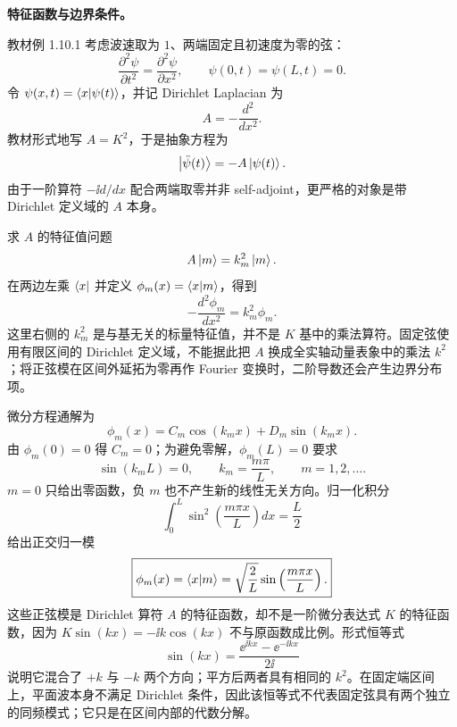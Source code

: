 \begin{checkedsolution}
\textbf{特征函数与边界条件。}

教材例 1.10.1 考虑波速取为 $1$、两端固定且初速度为零的弦：
\begin{equation}
  \frac{\partial^2\psi}{\partial t^2}
  =\frac{\partial^2\psi}{\partial x^2},
  \qquad
  \psi(0,t)=\psi(L,t)=0.
  \label{eq:QM-C01-S10-wave-equation}
\end{equation}
令 $\psi(x,t)=\left\langle x \middle| \psi(t) \right\rangle$，并记 Dirichlet Laplacian 为
\[
  A=-\frac{d^2}{dx^2}.
\]
教材形式地写 $A=K^2$，于是抽象方程为
\begin{equation}
  \left|\ddot\psi(t)\right\rangle=-A\left|\psi(t)\right\rangle.
  \label{eq:QM-C01-S10-abstract-wave-equation}
\end{equation}
由于一阶算符 $-\ii d/dx$ 配合两端取零并非 self-adjoint，更严格的对象是带 Dirichlet 定义域的 $A$ 本身。

求 $A$ 的特征值问题
\begin{equation}
  A\left|m\right\rangle=k_m^2\left|m\right\rangle.
  \label{eq:QM-C01-S10-string-abstract-eigenproblem}
\end{equation}
在两边左乘 $\left\langle x\right|$ 并定义 $\phi_m(x)=\left\langle x \middle| m \right\rangle$，得到
\begin{equation}
  -\frac{d^2\phi_m}{dx^2}=k_m^2\phi_m.
  \label{eq:QM-C01-S10-string-x-eigenproblem}
\end{equation}
这里右侧的 $k_m^2$ 是与基无关的标量特征值，并不是 $K$ 基中的乘法算符。固定弦使用有限区间的 Dirichlet 定义域，不能据此把 $A$ 换成全实轴动量表象中的乘法 $k^2$；将正弦模在区间外延拓为零再作 Fourier 变换时，二阶导数还会产生边界分布项。

微分方程通解为
\[
  \phi_m(x)=C_m\cos(k_mx)+D_m\sin(k_mx).
\]
由 $\phi_m(0)=0$ 得 $C_m=0$；为避免零解，$\phi_m(L)=0$ 要求
\begin{equation}
  \sin(k_mL)=0,
  \qquad
  k_m=\frac{m\pi}{L},
  \qquad m=1,2,\ldots.
  \label{eq:QM-C01-S10-string-wavenumbers}
\end{equation}
$m=0$ 只给出零函数，负 $m$ 也不产生新的线性无关方向。归一化积分
\[
  \int_0^L\sin^2\left(\frac{m\pi x}{L}\right)dx=\frac L2
\]
给出正交归一模
\begin{equation}
  \boxed{
  \phi_m(x)=\left\langle x \middle| m \right\rangle
  =\sqrt{\frac2L}\sin\left(\frac{m\pi x}{L}\right).}
  \label{eq:QM-C01-S10-string-normal-modes}
\end{equation}
这些正弦模是 Dirichlet 算符 $A$ 的特征函数，却不是一阶微分表达式 $K$ 的特征函数，因为 $K\sin(kx)=-\ii k\cos(kx)$ 不与原函数成比例。形式恒等式
\[
  \sin(kx)=\frac{\ee^{\ii kx}-\ee^{-\ii kx}}{2\ii}
\]
说明它混合了 $+k$ 与 $-k$ 两个方向；平方后两者具有相同的 $k^2$。在固定端区间上，平面波本身不满足 Dirichlet 条件，因此该恒等式不代表固定弦具有两个独立的同频模式；它只是在区间内部的代数分解。


\end{checkedsolution}
